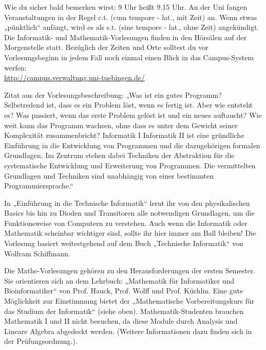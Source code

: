 
Wie du sicher bald bemerken wirst: 9 Uhr heißt 9.15 Uhr. An der Uni fangen Veranstaltungen in der Regel c.t. (cum
tempore - lat., mit Zeit) an. Wenn etwas „pünktlich“ anfängt, wird es als s.t. (sine tempore - lat., ohne
Zeit) angekündigt. Die Informatik- und Mathematik-Vorlesungen finden in den Hörsälen auf der
Morgenstelle statt. Bezüglich der Zeiten und Orte solltest du vor Vorlesungsbeginn in jedem Fall noch einmal einen Blick in das Campus-System werfen:\\
\url{http://campus.verwaltung.uni-tuebingen.de/}

\ifbachelor
{}
Zitat aus der Vorlesungsbeschreibung: „Was ist ein gutes Programm? Selbstredend ist, dass es ein
Problem löst, wenn es fertig ist. Aber wie entsteht es? Was passiert, wenn das erste Problem gelöst
ist und ein neues auftaucht? Wie weit kann das Programm wachsen, ohne dass es unter dem Gewicht
seiner Komplexität zusammenbricht? 
\ifwintersemester
Informatik I 
\fi
\ifsommersemester
Informatik II
\fi 
ist eine gründliche Einführung in die Entwicklung
von Programmen und die dazugehörigen formalen Grundlagen. Im Zentrum stehen dabei Techniken der Abstraktion
für die systematische Entwicklung und Erweiterung von Programmen. Die vermittelten Grundlagen und Techniken
sind unabhängig von einer bestimmten Programmiersprache.“


\ifinfo
\ifwintersemester
{}
In „Einführung in die Technische Informatik“ lernt ihr von den physikalischen Basics bis hin zu Dioden und Transitoren alle notwendigen Grundlagen, um die Funktionsweise von Computern zu verstehen. Auch wenn die Informatik oder Mathematik scheinbar wichtiger sind, sollte ihr hier immer am Ball bleiben! Die Vorlesung basiert weitestgehend auf dem Buch „Technische Informatik“ von Wolfram Schiffmann.
\fi
\fi

Die Mathe-Vorlesungen gehören zu den Herausforderungen der ersten Semester. Sie orientieren
sich an dem Lehrbuch: „Mathematik für Informatiker und Bioinformatiker“ von Prof.
Hauck, Prof. Wolff und Prof. Küchlin. Eine gute Möglichkeit zur Einstimmung bietet der „Mathematische
Vorbereitungskurs für das Studium der Informatik“ (siehe oben).
\iflehramt
Mathematik-Studenten brauchen Mathematik I
und II nicht besuchen, da diese Module durch Analysis und Lineare Algebra
abgedeckt werden. (Weitere Informationen dazu finden sich in der
Prüfungsordnung.).
\fi
\fi